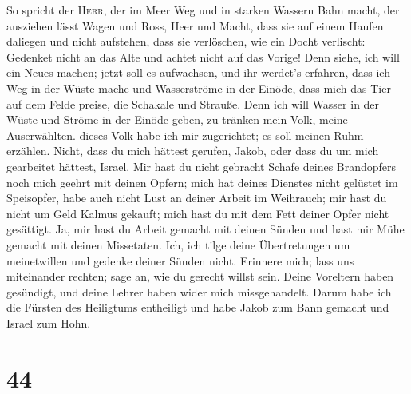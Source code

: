  So spricht der \textsc{Herr}, der im Meer Weg und in
starken Wassern Bahn macht,  der ausziehen lässt Wagen
und Ross, Heer und Macht, dass sie auf einem Haufen daliegen und nicht
aufstehen, dass sie verlöschen, wie ein Docht verlischt: 
Gedenket nicht an das Alte und achtet nicht auf das Vorige!
 Denn siehe, ich will ein Neues machen; jetzt soll es
aufwachsen, und ihr werdet's erfahren, dass ich Weg in der Wüste mache
und Wasserströme in der Einöde,  dass mich das Tier auf
dem Felde preise, die Schakale und Strauße. Denn ich will Wasser in der
Wüste und Ströme in der Einöde geben, zu tränken mein Volk, meine
Auserwählten.  dieses Volk habe ich mir zugerichtet; es
soll meinen Ruhm erzählen.  Nicht, dass du mich hättest
gerufen, Jakob, oder dass du um mich gearbeitet hättest, Israel.
 Mir hast du nicht gebracht Schafe deines Brandopfers
noch mich geehrt mit deinen Opfern; mich hat deines Dienstes nicht
gelüstet im Speisopfer, habe auch nicht Lust an deiner Arbeit im
Weihrauch;  mir hast du nicht um Geld Kalmus gekauft;
mich hast du mit dem Fett deiner Opfer nicht gesättigt. Ja, mir hast du
Arbeit gemacht mit deinen Sünden und hast mir Mühe gemacht mit deinen
Missetaten.  Ich, ich tilge deine Übertretungen um
meinetwillen und gedenke deiner Sünden nicht.  Erinnere
mich; lass uns miteinander rechten; sage an, wie du gerecht willst sein.
 Deine Voreltern haben gesündigt, und deine Lehrer haben
wider mich missgehandelt.  Darum habe ich die Fürsten des
Heiligtums entheiligt und habe Jakob zum Bann gemacht und Israel zum
Hohn.

\hypertarget{section-43}{%
\section{44}\label{section-43}}

